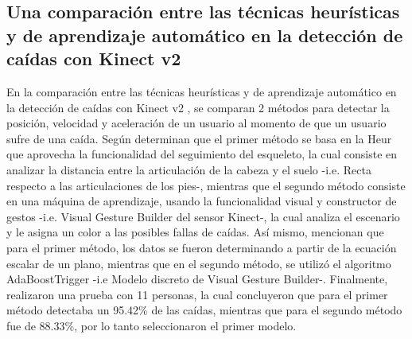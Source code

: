 \subsection{Una comparaci\'on entre las t\'ecnicas heur\'isticas y de aprendizaje autom\'atico en la detecci\'on de ca\'idas con Kinect v2} \label{tr:7}
En la comparaci\'on entre las t\'ecnicas heur\'isticas y de aprendizaje autom\'atico en la detecci\'on de ca\'idas con Kinect v2 \cite{amini2016comparison}, se comparan 2 m\'etodos para detectar la posici\'on, velocidad y aceleraci\'on de un usuario al momento de que un usuario sufre de una ca\'ida.
\medbreak 
Seg\'un  determinan que  el primer m\'etodo se basa en la \gls{Heur} que aprovecha la funcionalidad del seguimiento del esqueleto, la cual consiste en analizar la distancia entre la articulaci\'on de la cabeza y el suelo -i.e. Recta respecto a las articulaciones de los pies-, mientras que el segundo m\'etodo consiste en una m\'aquina de aprendizaje, usando la funcionalidad visual y constructor de gestos -i.e. Visual Gesture Builder del sensor Kinect-, la cual analiza el escenario y le asigna un color a las posibles fallas de ca\'idas.
\medbreak 
As\'i mismo,  mencionan que para el primer m\'etodo, los datos se fueron determinando a partir de la ecuaci\'on escalar de un plano, mientras que en el segundo m\'etodo, se utiliz\'o el algoritmo AdaBoostTrigger -i.e Modelo discreto de Visual Gesture Builder-.
\medbreak 
Finalmente,  realizaron una prueba con 11 personas, la cual concluyeron que para el primer m\'etodo detectaba un 95.42\% de las ca\'idas, mientras que para el segundo m\'etodo fue de 88.33\%, por lo tanto seleccionaron el primer modelo.
